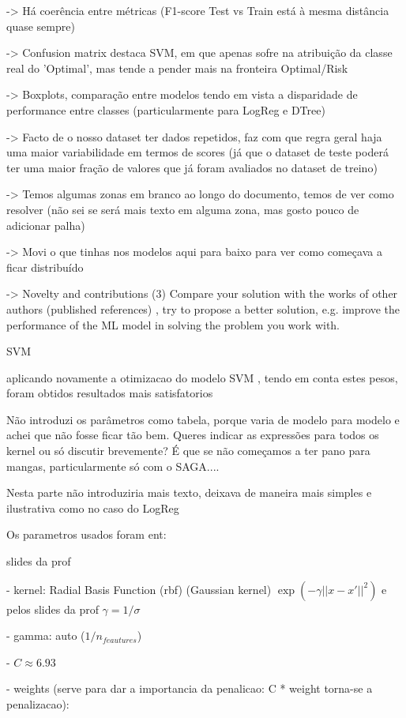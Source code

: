 \documentclass[conference]{IEEEtran}
\begin{document}
-> Há coerência entre métricas (F1-score Test vs Train está à mesma distância quase sempre)

-> Confusion matrix destaca SVM, em que apenas sofre na atribuição da classe real do 'Optimal', mas tende a pender mais na fronteira Optimal/Risk

-> Boxplots, comparação entre modelos tendo em vista a disparidade de performance entre classes (particularmente para LogReg e DTree)

-> Facto de o nosso dataset ter dados repetidos, faz com que regra geral haja uma maior variabilidade em termos de scores (já que o dataset de teste poderá ter uma maior fração de valores que já foram avaliados no dataset de treino)

-> Temos algumas zonas em branco ao longo do documento, temos de ver como resolver (não sei se será mais texto em alguma zona, mas gosto pouco de adicionar palha)

-> Movi o que tinhas nos modelos aqui para baixo para ver como começava a ficar distribuído

-> Novelty and contributions (3) Compare your solution with the works of other authors (published references) , try to propose a better solution, e.g. improve the performance of the ML model in solving the problem you work with.

SVM

aplicando novamente a otimizacao do modelo SVM , tendo em conta estes pesos, foram obtidos resultados mais satisfatorios

Não introduzi os parâmetros como tabela, porque varia de modelo para modelo e achei que não fosse ficar tão bem. Queres indicar as expressões para todos os kernel ou só discutir brevemente? É que se não começamos a ter pano para mangas, particularmente só com o SAGA....

Nesta parte não introduziria mais texto, deixava de maneira mais simples e ilustrativa como no caso do LogReg


Os parametros usados foram ent:

slides da prof

- kernel: Radial Basis Function (rbf) (Gaussian kernel) $\exp(-\gamma ||x - x'||^2)$ e pelos slides da prof $\gamma = 1 / \sigma$ 

- gamma: auto ($1 / n_{feautures}$)

- $C \approx 6.93$

- weights (serve para dar a importancia da penalicao: C * weight torna-se a penalizacao): 
\end{document}
